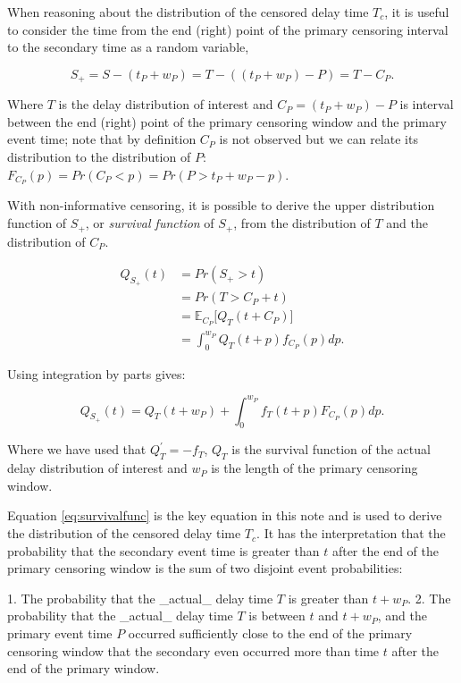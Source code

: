 \documentclass[10pt,letterpaper]{article}
\begin{document}
When reasoning about the distribution of the censored delay time $T_c$, it is useful to consider the time from the end (right) point of the primary censoring interval to the secondary time as a random variable,

$$
S_+ = S - (t_P + w_P) = T - ((t_P + w_P) - P) = T - C_P.
$$

Where $T$ is the delay distribution of interest and $C_P = (t_P + w_P) - P$ is interval between the end (right) point of the primary censoring window and the primary event time; note that by definition $C_P$ is not observed but we can relate its distribution to the distribution of $P$: $F_{C_P}(p) = Pr(C_P < p) = Pr(P > t_P + w_P - p)$.

With non-informative censoring, it is possible to derive the upper distribution function of $S_+$, or \textit{survival function} of $S_+$, from the distribution of $T$ and the distribution of $C_P$.


\begin{equation}
\begin{split}
Q_{S_+}(t) &= Pr(S_+ > t) \\
&= Pr(T > C_P + t) \\
&= \mathbb{E}_{C_P} \Big[Q_T(t + C_P)\Big] \\
&= \int_0^{w_P} Q_T(t + p) f_{C_P}(p) dp.
\end{split}
\end{equation}


Using integration by parts gives:

\begin{equation}
\label{eq:survivalfunc}
Q_{S_+}(t) = Q_T(t + w_P) + \int_0^{w_P} f_T(t+p) F_{C_P}(p) dp.
\end{equation}

Where we have used that $Q^{'}_{T} = - f_T$, $Q_T$ is the survival function of the actual delay distribution of interest and $w_P$ is the length of the primary censoring window.

Equation \ref{eq:survivalfunc} is the key equation in this note and is used to derive the distribution of the censored delay time $T_c$. It has the interpretation that the probability that the secondary event time is greater than $t$ after the end of the primary censoring window is the sum of two disjoint event probabilities:

1. The probability that the _actual_ delay time $T$ is greater than $t + w_P$.
2. The probability that the _actual_ delay time $T$ is between $t$ and $t + w_P$, and the primary event time $P$ occurred sufficiently close to the end of the primary censoring window that the secondary even occurred more than time $t$ after the end of the primary window.
\end{document}
